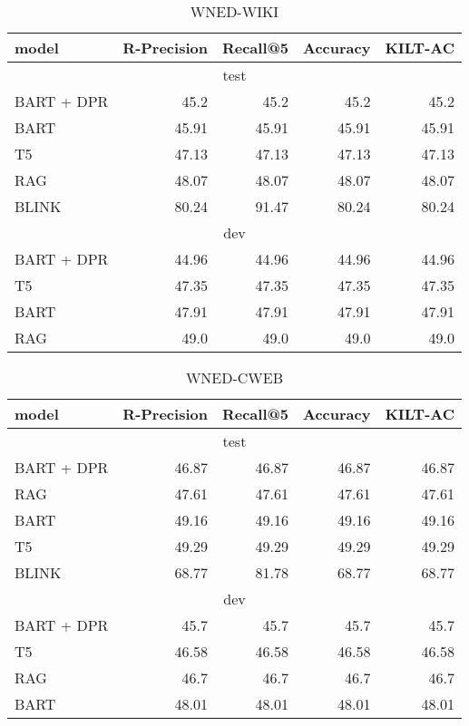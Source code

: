 \documentclass[11pt]{article}
\begin{document}
 \begin{table*}[ht]
\centering
\begin{tabular}{l@{\hskip 2em}rrrr}
 \toprule
model & \textbf{R-Precision} & \textbf{Recall@5} & \textbf{Accuracy}  & \textbf{KILT-AC}  \\
\midrule
\multicolumn{5}{c}{test} \\
\midrule
BART + DPR & 45.2 & 45.2 & 45.2 & 45.2 \\ 
BART & 45.91 & 45.91 & 45.91 & 45.91 \\ 
T5 & 47.13 & 47.13 & 47.13 & 47.13 \\ 
RAG & 48.07 & 48.07 & 48.07 & 48.07 \\ 
BLINK & 80.24 & 91.47 & 80.24 & 80.24 \\ 
\midrule
\multicolumn{5}{c}{dev} \\
\midrule
BART + DPR & 44.96 & 44.96 & 44.96 & 44.96 \\ 
T5 & 47.35 & 47.35 & 47.35 & 47.35 \\ 
BART & 47.91 & 47.91 & 47.91 & 47.91 \\ 
RAG & 49.0 & 49.0 & 49.0 & 49.0 \\ 
\bottomrule
\end{tabular}
\caption{WNED-WIKI}
\label{tab:WnWi}
\end{table*}
 \begin{table*}[ht]
\centering
\begin{tabular}{l@{\hskip 2em}rrrr}
 \toprule
model & \textbf{R-Precision} & \textbf{Recall@5} & \textbf{Accuracy}  & \textbf{KILT-AC}  \\
\midrule
\multicolumn{5}{c}{test} \\
\midrule
BART + DPR & 46.87 & 46.87 & 46.87 & 46.87 \\
RAG & 47.61 & 47.61 & 47.61 & 47.61 \\
BART & 49.16 & 49.16 & 49.16 & 49.16 \\ 
T5 & 49.29 & 49.29 & 49.29 & 49.29 \\
BLINK & 68.77 & 81.78 & 68.77 & 68.77 \\ 
\midrule
\multicolumn{5}{c}{dev} \\
\midrule
BART + DPR & 45.7 & 45.7 & 45.7 & 45.7 \\
T5 & 46.58 & 46.58 & 46.58 & 46.58 \\ 
RAG & 46.7 & 46.7 & 46.7 & 46.7 \\ 
BART & 48.01 & 48.01 & 48.01 & 48.01 \\ 
\bottomrule
\end{tabular}
\caption{WNED-CWEB}
\label{tab:WnCw}
\end{table*}
\end{document}
